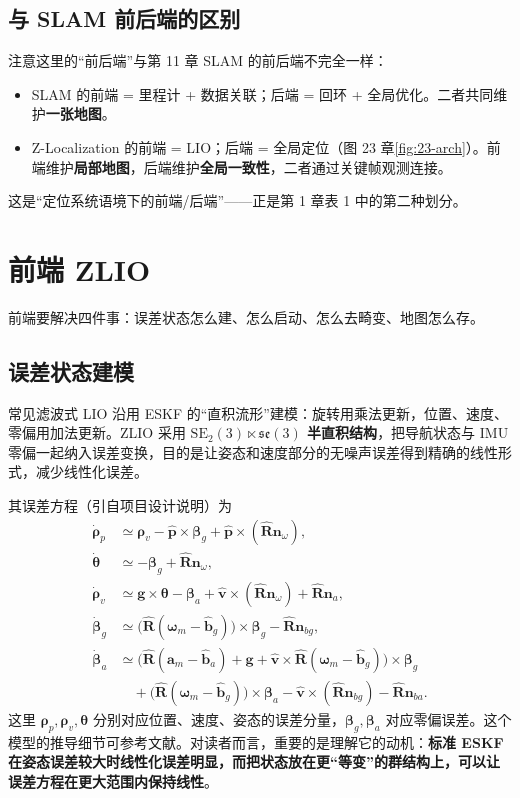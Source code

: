 \subsection{与 SLAM 前后端的区别}

注意这里的“前后端”与第 11 章 SLAM 的前后端不完全一样：
\begin{itemize}
  \item SLAM 的前端 = 里程计 + 数据关联；后端 = 回环 + 全局优化。二者共同维护\textbf{一张地图}。
  \item Z-Localization 的前端 = LIO；后端 = 全局定位（图 23 章\ref{fig:23-arch}）。前端维护\textbf{局部地图}，后端维护\textbf{全局一致性}，二者通过关键帧观测连接。
\end{itemize}
这是“定位系统语境下的前端/后端”——正是第 1 章表 1 中的第二种划分。

\section{前端 ZLIO}\label{sec:23-frontend}

前端要解决四件事：误差状态怎么建、怎么启动、怎么去畸变、地图怎么存。

\subsection{误差状态建模}

常见滤波式 LIO 沿用 ESKF 的“直积流形”建模：旋转用乘法更新，位置、速度、零偏用加法更新。ZLIO 采用 \textbf{$\mathrm{SE}_2(3)\ltimes\mathfrak{se}(3)$ 半直积结构}，把导航状态与 IMU 零偏一起纳入误差变换，目的是让姿态和速度部分的无噪声误差得到精确的线性形式，减少线性化误差。

其误差方程（引自项目设计说明）为
\begin{align}
\dot{\bm{\rho}}_p &\simeq \bm{\rho}_v-\hat{\bm{p}}\times\bm{\beta}_g+\hat{\bm{p}}\times(\hat{\bm{R}}\bm{n}_\omega),\\
\dot{\bm{\theta}} &\simeq -\bm{\beta}_g+\hat{\bm{R}}\bm{n}_\omega,\\
\dot{\bm{\rho}}_v &\simeq \bm{g}\times\bm{\theta}-\bm{\beta}_a+\hat{\bm{v}}\times(\hat{\bm{R}}\bm{n}_\omega)+\hat{\bm{R}}\bm{n}_a,\\
\dot{\bm{\beta}}_g &\simeq \bigl(\hat{\bm{R}}(\bm{\omega}_m-\hat{\bm{b}}_g)\bigr)\times\bm{\beta}_g-\hat{\bm{R}}\bm{n}_{bg},\\
\dot{\bm{\beta}}_a &\simeq \bigl(\hat{\bm{R}}(\bm{a}_m-\hat{\bm{b}}_a)+\bm{g}+\hat{\bm{v}}\times\hat{\bm{R}}(\bm{\omega}_m-\hat{\bm{b}}_g)\bigr)\times\bm{\beta}_g \nonumber\\
&\quad +\bigl(\hat{\bm{R}}(\bm{\omega}_m-\hat{\bm{b}}_g)\bigr)\times\bm{\beta}_a-\hat{\bm{v}}\times(\hat{\bm{R}}\bm{n}_{bg})-\hat{\bm{R}}\bm{n}_{ba}.
\label{eq:23-err}
\end{align}
这里 $\bm{\rho}_p,\bm{\rho}_v,\bm{\theta}$ 分别对应位置、速度、姿态的误差分量，$\bm{\beta}_g,\bm{\beta}_a$ 对应零偏误差。这个模型的推导细节可参考文献\cite{equi2023}。对读者而言，重要的是理解它的动机：\textbf{标准 ESKF 在姿态误差较大时线性化误差明显，而把状态放在更“等变”的群结构上，可以让误差方程在更大范围内保持线性}。

